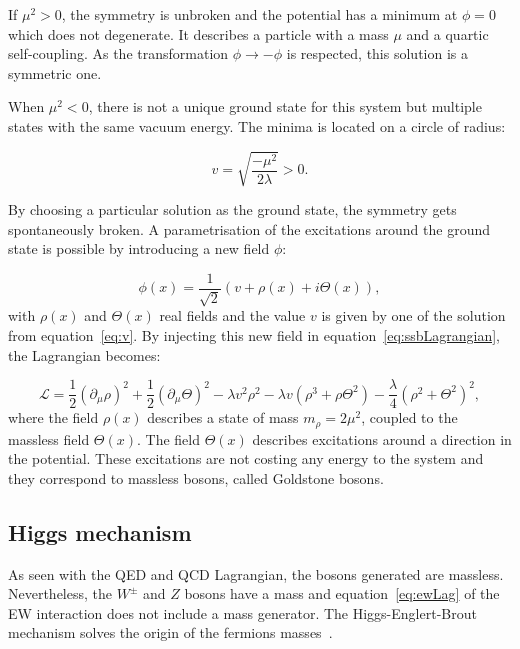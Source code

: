       If $\mu^{2} > 0$, the symmetry is unbroken and the potential has a minimum at $\phi = 0$ which does not degenerate.
      It describes a particle with a mass $\mu$ and a quartic self-coupling.
      As the transformation $\phi \rightarrow  - \phi$ is respected, this solution is a symmetric one.

      When $\mu^{2} < 0$, there is not a unique ground state for this system but multiple states with the same vacuum energy.
      The minima is located on a circle of radius:

      \begin{equation}
        v = \sqrt{\frac{- \mu^2}{2\lambda}} > 0.
        \label{eq:v}
      \end{equation}

      By choosing a particular solution as the ground state, the symmetry gets spontaneously broken.
      A parametrisation of the excitations around the ground state is possible by introducing a new field $\phi$:

      \begin{equation}
        \phi(x) = \frac{1}{\sqrt{2}} \left( v + \rho(x) + i\Theta(x) \right),
      \end{equation}
      with $\rho(x)$ and $\Theta(x)$ real fields and the value $v$ is given by one of the solution from equation~\ref{eq:v}.
      By injecting this new field in equation~\ref{eq:ssbLagrangian}, the Lagrangian becomes:

      \begin{equation}
        \mathcal{L} = \frac{1}{2} (\partial_{\mu}\rho)^2 + \frac{1}{2}(\partial_{\mu}\Theta)^2 - \lambda v^2 \rho^2 - \lambda v (\rho^3 +\rho \Theta^2) - \frac{\lambda}{4}(\rho^2 + \Theta^2)^2,
      \end{equation}
      where the field $\rho(x)$ describes a state of mass $m_{\rho} = 2 \mu^2$, coupled to the massless field $\Theta(x)$.
      The field $\Theta(x)$ describes excitations around a direction in the potential.
      These excitations are not costing any energy to the system and they correspond to massless bosons, called Goldstone bosons.

      \subsection{Higgs mechanism}
      \label{sec:higgsMechanism}
      
      As seen with the \gls{QED} and \gls{QCD} Lagrangian, the bosons generated are massless.
      Nevertheless, the $W^{\pm}$ and $Z$ bosons have a mass and equation~\ref{eq:ewLag} of the \gls{EW} interaction does not include a mass generator.
      The Higgs-Englert-Brout mechanism solves the origin of the fermions masses~\cite{PhysRevLett.13.508}\cite{1964PhRvL..13..321E}.
       
